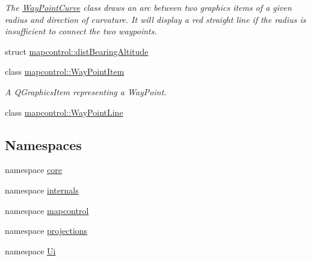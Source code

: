 \begin{DoxyCompactItemize}
\begin{DoxyCompactList}\small\item\em \-The \hyperlink{classmapcontrol_1_1_way_point_curve}{\-Way\-Point\-Curve} class draws an arc between two graphics items of a given radius and direction of curvature. \-It will display a red straight line if the radius is insufficient to connect the two waypoints. \end{DoxyCompactList}\item 
struct \hyperlink{structmapcontrol_1_1dist_bearing_altitude}{mapcontrol\-::dist\-Bearing\-Altitude}
\item 
class \hyperlink{classmapcontrol_1_1_way_point_item}{mapcontrol\-::\-Way\-Point\-Item}
\begin{DoxyCompactList}\small\item\em \-A \-Q\-Graphics\-Item representing a \-Way\-Point. \end{DoxyCompactList}\item 
class \hyperlink{classmapcontrol_1_1_way_point_line}{mapcontrol\-::\-Way\-Point\-Line}
\end{DoxyCompactItemize}
\subsection*{\-Namespaces}
\begin{DoxyCompactItemize}
\item 
namespace \hyperlink{namespacecore}{core}
\item 
namespace \hyperlink{namespaceinternals}{internals}
\item 
namespace \hyperlink{namespacemapcontrol}{mapcontrol}
\item 
namespace \hyperlink{namespaceprojections}{projections}
\item 
namespace \hyperlink{namespace_ui}{\-Ui}
\end{DoxyCompactItemize}
